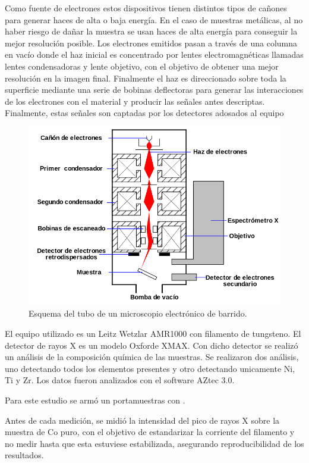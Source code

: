 \documentclass{article}
\theoremstyle{definition}
\theoremstyle{remark}
\begin{document}
Como fuente de electrones estos dispositivos tienen distintos tipos de cañones para generar haces de alta o baja energía. En el caso de muestras metálicas, al no haber riesgo de dañar la muestra se usan haces de alta energía para conseguir la mejor resolución posible. Los electrones emitidos pasan a través de una columna en vacío donde el haz inicial es concentrado por lentes electromagnéticas llamadas lentes condensadoras y lente objetivo, con el objetivo de obtener una mejor resolución en la imagen final. Finalmente el haz es direccionado sobre toda la superficie mediante una serie de bobinas deflectoras para generar las interacciones de los electrones con el material y producir las señales antes descriptas. Finalmente, estas señales son captadas por los detectores adosados al equipo

 \begin{figure}[H]
 	\centering
	\includegraphics[scale=0.5]{img/SEM.png}
 	\caption{Esquema del tubo de un microscopio electrónico de barrido.}
	\label{SEM}
\end{figure} 

El equipo utilizado es un Leitz Wetzlar AMR1000 con filamento de tungsteno. El detector de rayos X es un modelo Oxforde XMAX. Con dicho detector se realizó un análisis de la composición química de las muestras. Se realizaron dos análisis, uno detectando todos los elementos presentes y otro detectando unicamente Ni, Ti y Zr. Los datos fueron analizados con el software AZtec 3.0.

Para este estudio se armó un portamuestras con .

Antes de cada medición, se midió la intensidad del pico de rayos X sobre la muestra de Co puro, con el objetivo de estandarizar la corriente del filamento y no medir hasta que esta estuviese estabilizada, asegurando reproducibilidad de los resultados.
\end{document}
